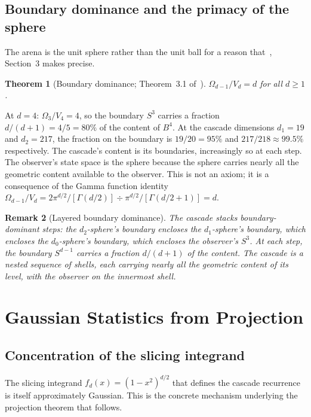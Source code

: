 \documentclass[12pt,a4paper]{article}
\newtheorem{theorem}{Theorem}[section]
\newtheorem{remark}[theorem]{Remark}
\begin{document}
\subsection{Boundary dominance and the primacy of the sphere}

The arena is the unit sphere rather than the unit ball for a reason that~\cite{paperI},
Section~3 makes precise.

\begin{theorem}[Boundary dominance; Theorem~3.1 of~\cite{paperI}]
$\Omega_{d-1}/V_d=d$ for all $d\geq 1$.
\end{theorem}

At $d=4$: $\Omega_3/V_4=4$, so the boundary $S^3$ carries a fraction $d/(d+1)=4/5=80\%$
of the content of $B^4$. At the cascade dimensions $d_1=19$ and $d_2=217$, the fraction
on the boundary is $19/20=95\%$ and $217/218\approx 99.5\%$ respectively. The cascade's
content is its boundaries, increasingly so at each step. The observer's state space is the
sphere because the sphere carries nearly all the geometric content available to the observer.
This is not an axiom; it is a consequence of the Gamma function identity
$\Omega_{d-1}/V_d = 2\pi^{d/2}/[\Gamma(d/2)] \div \pi^{d/2}/[\Gamma(d/2+1)] = d$.

\begin{remark}[Layered boundary dominance]
The cascade stacks boundary-dominant steps: the $d_2$-sphere's boundary encloses the
$d_1$-sphere's boundary, which encloses the $d_0$-sphere's boundary, which encloses the
observer's $S^3$. At each step, the boundary $S^{d-1}$ carries a fraction $d/(d+1)$ of the
content. The cascade is a nested sequence of shells, each carrying nearly all the geometric
content of its level, with the observer on the innermost shell.
\end{remark}

\section{Gaussian Statistics from Projection}

\subsection{Concentration of the slicing integrand}

The slicing integrand $f_d(x) = (1-x^2)^{d/2}$ that defines the cascade recurrence
is itself approximately Gaussian. This is the concrete mechanism underlying the
projection theorem that follows.
\end{document}
